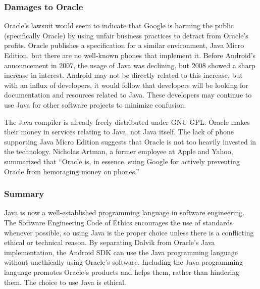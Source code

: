 \documentclass[11pt]{article}
\begin{document}
\begin{multicols}{2}

\subsubsection{Damages to Oracle} %
\label{ssub:oracle-damage}

Oracle's lawsuit would seem to indicate that Google is harming the public
(specifically Oracle) by using unfair business practices to detract from
Oracle's profits.  Oracle publishes a specification for a similar environment,
Java Micro Edition, but there are no well-known phones that implement it.
Before Android's announcement in 2007, the usage of Java was declining, but 2008
showed a sharp increase in interest.  \cite{tiobe}  Android may not be directly
related to this increase, but with an influx of developers, it would follow that
developers will be looking for documentation and resources related to Java.
These developers may continue to use Java for other software projects to
minimize confusion.

The Java compiler is already freely distributed under GNU GPL.  Oracle makes
their money in services relating to Java, not Java itself.  The lack of phone
supporting Java Micro Edition suggests that Oracle is not too heavily invested
in the technology.  Nicholas Artman, a former employee at Apple and Yahoo,
summarized that ``Oracle is, in essence, suing Google for actively preventing
Oracle from hemoraging money on phones.'' \cite{artman}


\subsubsection{Summary} %
\label{ssub:java-summary}

Java is now a well-established programming language in software engineering.
The Software Engineering Code of Ethics encourages the use of standards whenever
possible, so using Java is the proper choice unless there is a conflicting
ethical or technical reason.  By separating Dalvik from Oracle's Java
implementation, the Android SDK can use the Java programming language without
unethically using Oracle's software.  Including the Java programming language
promotes Oracle's products and helps them, rather than hindering them.  The
choice to use Java is ethical.




\end{multicols}
\end{document}
